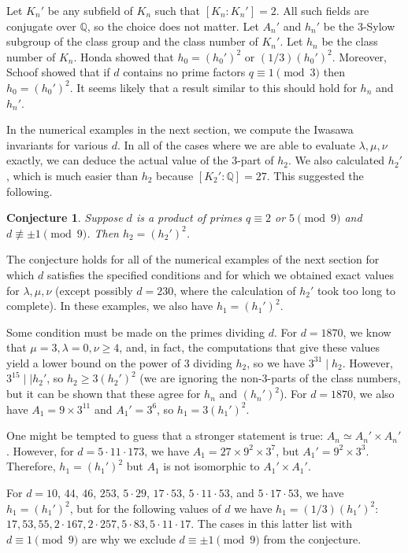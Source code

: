 \documentclass{amsart}
\newtheorem{conjecture}{Conjecture}
\begin{document}
Let $K_n'$ be any subfield of $K_n$ such that $[K_n : K_n']=2$. All such fields are conjugate over $\mathbb Q$, so the choice does not matter.
Let $A_n'$ and $h_n'$ be the $3$-Sylow subgroup of the class group and the class number of $K_n'$.
Let $h_n$ be the class number of $K_n$. Honda \cite{Honda} showed that $h_0 = (h_0')^2$ or $(1/3)(h_0')^2$. Moreover, Schoof \cite{Schoof}
showed that if $d$ contains no prime factors $q\equiv 1\pmod 3$ then $h_0 = (h_0')^2$. It seems likely that a result similar to this
should hold for $h_n$ and $h_n'$. 

In the numerical examples in the next section, we compute the Iwasawa invariants for various $d$. In all of the cases where
we are able to evaluate $\lambda, \mu, \nu$ exactly, we can deduce the actual value of the 3-part of $h_2$.
We also calculated $h_2'$, which is much easier than $h_2$ because $[K_2' : \mathbb Q]=27$. This suggested the following.

\begin{conjecture} Suppose $d$ is a product of primes $q\equiv 2$ or $5\pmod 9$ and $d\not\equiv \pm 1\pmod 9$.
Then $h_2= (h_2')^2$.
\end{conjecture}

The conjecture holds for all of the numerical examples of the next section for which $d$ satisfies the specified conditions
and for which we obtained exact values for $\lambda, \mu, \nu$ (except possibly $d=230$, where the calculation of $h_2'$ took too long to complete).
In these examples, we also have $h_1=(h_1')^2$. 

Some condition must be made on the primes dividing $d$. 
For $d=1870$, we know that $\mu=3, \lambda=0, \nu\ge 4$, and, in fact, 
the computations that give these values yield a lower bound on the power of 3 dividing $h_2$, so we have  $3^{31}\mid h_2$.
However, $3^{15}\mid\mid h_2'$, so $h_2\ge 3(h_2')^2$ (we are ignoring the non-3-parts of the class numbers, but it can be shown
that these agree for $h_n$ and $(h_n')^2$). For $d=1870$, we also have $A_1=9\times 3^{11}$ and $A_1'=3^6$, so
$h_1=3(h_1')^2$.

One might be tempted to guess that a stronger statement is true: $A_n\simeq A_n'\times A_n'$. However,
for $d=5\cdot 11\cdot 173$, we have $A_1=27\times 9^2\times 3^7$, but $A_1'=9^2\times 3^3$. Therefore, $h_1=(h_1')^2$
but $A_1$ is not isomorphic to $A_1'\times A_1'$.

For $d= 10$, $44$, $46$, $253$, $5\cdot 29$, $17\cdot 53$, $5\cdot 11\cdot 53$, and $5\cdot 17\cdot 53$, 
we have $h_1=(h_1')^2$, but for the following values of $d$ we have $h_1=(1/3)(h_1')^2$:
$17,  53,  55,  2\cdot 167, 2\cdot 257, 5\cdot 83, 5\cdot 11\cdot 17$. The cases in this latter list with $d\equiv 1\pmod 9$ are why we exclude $d\equiv \pm 1\pmod 9$ from the conjecture.
\end{document}
